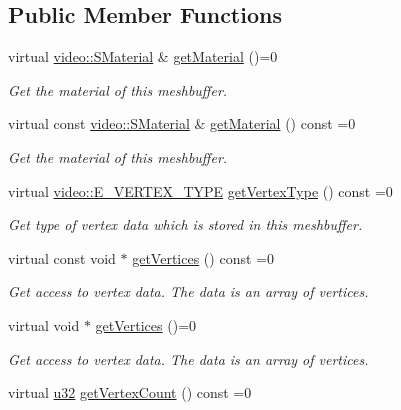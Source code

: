 \subsection*{Public Member Functions}
\begin{DoxyCompactItemize}
\item 
virtual \hyperlink{classirr_1_1video_1_1SMaterial}{video\+::\+S\+Material} \& \hyperlink{classirr_1_1scene_1_1IMeshBuffer_a26fd922f00fde56abbbbbe40b485238b}{get\+Material} ()=0
\begin{DoxyCompactList}\small\item\em Get the material of this meshbuffer. \end{DoxyCompactList}\item 
virtual const \hyperlink{classirr_1_1video_1_1SMaterial}{video\+::\+S\+Material} \& \hyperlink{classirr_1_1scene_1_1IMeshBuffer_a341c1da2fd0cd556a15aab06d07dbbaa}{get\+Material} () const =0
\begin{DoxyCompactList}\small\item\em Get the material of this meshbuffer. \end{DoxyCompactList}\item 
virtual \hyperlink{namespaceirr_1_1video_a0e3b59e025e0d0db0ed2ee0ce904deac}{video\+::\+E\+\_\+\+V\+E\+R\+T\+E\+X\+\_\+\+T\+Y\+PE} \hyperlink{classirr_1_1scene_1_1IMeshBuffer_a4d7a84ae4416487736f0ed0f519bb4f0}{get\+Vertex\+Type} () const =0
\begin{DoxyCompactList}\small\item\em Get type of vertex data which is stored in this meshbuffer. \end{DoxyCompactList}\item 
virtual const void $\ast$ \hyperlink{classirr_1_1scene_1_1IMeshBuffer_a99891e516246b2cff13b362a435c8028}{get\+Vertices} () const =0
\begin{DoxyCompactList}\small\item\em Get access to vertex data. The data is an array of vertices. \end{DoxyCompactList}\item 
virtual void $\ast$ \hyperlink{classirr_1_1scene_1_1IMeshBuffer_ac1695efc198b05a086487606bc2783e7}{get\+Vertices} ()=0
\begin{DoxyCompactList}\small\item\em Get access to vertex data. The data is an array of vertices. \end{DoxyCompactList}\item 
virtual \hyperlink{namespaceirr_a0416a53257075833e7002efd0a18e804}{u32} \hyperlink{classirr_1_1scene_1_1IMeshBuffer_a77ab285c8c886af8ddeb0371db7bde96}{get\+Vertex\+Count} () const =0

\end{DoxyCompactItemize}
